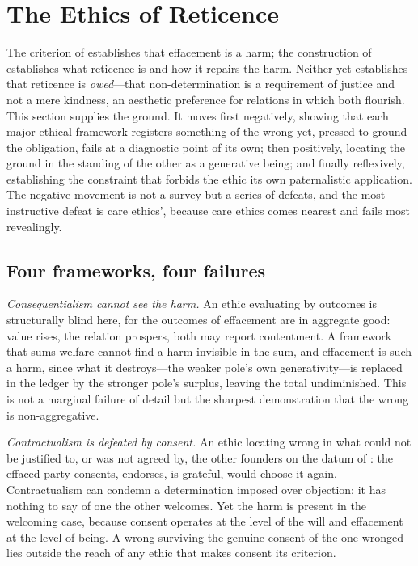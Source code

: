 \section{The Ethics of Reticence}
\label{p18:sec:ethics}

\noindent
The criterion of  establishes that effacement is a harm; the construction of  establishes what reticence is and how it repairs the harm. Neither yet establishes that reticence is \emph{owed}---that non-determination is a requirement of justice and not a mere kindness, an aesthetic preference for relations in which both flourish. This section supplies the ground. It moves first negatively, showing that each major ethical framework registers something of the wrong yet, pressed to ground the obligation, fails at a diagnostic point of its own; then positively, locating the ground in the standing of the other as a generative being; and finally reflexively, establishing the constraint that forbids the ethic its own paternalistic application. The negative movement is not a survey but a series of defeats, and the most instructive defeat is care ethics', because care ethics comes nearest and fails most revealingly.

\subsection{Four frameworks, four failures}
\label{p18:sub:eth-insufficiency}

\emph{Consequentialism cannot see the harm.} An ethic evaluating by outcomes is structurally blind here, for the outcomes of effacement are in aggregate good: value rises, the relation prospers, both may report contentment. A framework that sums welfare cannot find a harm invisible in the sum, and effacement is such a harm, since what it destroys---the weaker pole's own generativity---is replaced in the ledger by the stronger pole's surplus, leaving the total undiminished. This is not a marginal failure of detail but the sharpest demonstration that the wrong is non-aggregative.

\emph{Contractualism is defeated by consent.} An ethic locating wrong in what could not be justified to, or was not agreed by, the other founders on the datum of : the effaced party consents, endorses, is grateful, would choose it again. Contractualism can condemn a determination imposed over objection; it has nothing to say of one the other welcomes. Yet the harm is present in the welcoming case, because consent operates at the level of the will and effacement at the level of being. A wrong surviving the genuine consent of the one wronged lies outside the reach of any ethic that makes consent its criterion.

